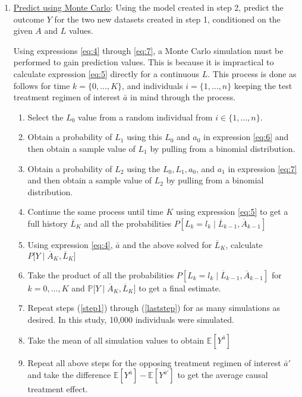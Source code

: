 \begin{enumerate}
\item \underline{Predict using Monte Carlo}: Using the model created in step 2, predict the outcome $Y$ for the two new datasets created in step 1, conditioned on the given $A$ and $L$ values.  

Using expressions \ref{eq:4} through \ref{eq:7}, a Monte Carlo simulation must be performed to gain prediction values.  This is because it is impractical to calculate expression \ref{eq:5} directly for a continuous $L$.  This process is done as follows for time $k = \{ 0, \dots, K \}$, and individuals $i = \{ 1, \dots, n \}$ keeping the test treatment regimen of interest $\bar{a}$ in mind through the process.  
\begin{enumerate} 
\item Select the $L_0$ value from a random individual from $i \in  \{ 1, \dots, n \}$. \label{step1}  
\item Obtain a probability of $L_1$ using this $L_0$ and $a_0$ in expression \ref{eq:6} and then obtain a sample value of $L_1$ by pulling from a binomial distribution.  
\item Obtain a probability of $L_2$ using the $L_0, L_1, a_0$, and $a_1$ in expression \ref{eq:7} and then obtain a sample value of $L_2$ by pulling from a binomial distribution.  
\item Continue the same process until time $K$ using expression \ref{eq:5} to get a full history $\overline{L}_K$ and all the probabilities $P[L_k = l_k \mid  \overline{L}_{k-1}, \overline{A}_{k-1}]$ 
\item Using expression \ref{eq:4}, $\bar{a}$ and the above solved for $\overline{L}_K$, calculate $P \big[Y \mid \overline{A}_K, \overline{L}_K \big]$ 
\item Take the product of all the probabilities $P[L_k = l_k \mid  \overline{L}_{k-1}, \overline{A}_{k-1}]$ for $k = 0, \dots, K$ and $\mathbb{P} \big[Y \mid \overline{A}_K, \overline{L}_K \big]$ to get a final estimate.  \label{laststep}
\item Repeat steps (\ref{step1}) through (\ref{laststep}) for as many simulations as desired.  In this study, 10,000 individuals were simulated.    
\item Take the mean of all simulation values to obtain $\mathbb{E}[Y^{\bar{a}}]$ 
\item Repeat all above steps for the opposing treatment regimen of interest $\bar{a}'$ and take the difference $\mathbb{E}[Y^{\bar{a}}] - \mathbb{E}[Y^{\bar{a}'}]$ to get the average causal treatment effect.  
\end{enumerate}
\end{enumerate} 

